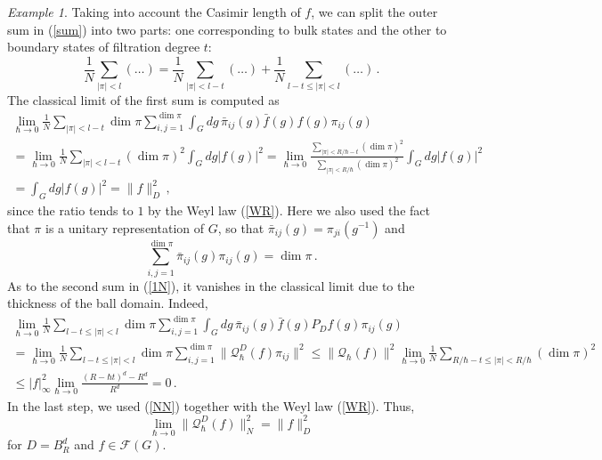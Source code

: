 \documentclass[12pt,a4paper]{article}
\numberwithin{equation}{section}
\theoremstyle{theorem}
\theoremstyle{remark}
\newtheorem{example}[equation]{Example}
\newcommand{\qq}{\mathcal{Q}_{\hbar}}
\newcommand{\ff}{\mathcal{F}}
\begin{document}
\begin{example}
Taking into account the Casimir length of $f$, we can split the outer sum in (\ref{sum}) into two parts: one corresponding to bulk states and the other to boundary states of filtration degree $t$:
\begin{equation}\label{1N}
\frac1N\sum_{|\pi|<l}(\ldots)=\frac1N\sum_{|\pi|<l-t}(\ldots)+\frac{1}{N}\sum_{ l-t\leq |\pi|<l}(\ldots)\,.
\end{equation}
The classical limit of the first sum is computed as
\begin{equation}
\begin{array}{c}
 \displaystyle  \lim_{\hbar\to 0} \frac1N\sum_{|\pi|<l-t}\dim \pi\sum_{i,j=1}^{\dim \pi}\int_Gdg\,\bar \pi_{ij}(g)\bar f(g)f(g)\pi_{ij}(g)\\[5mm]
 \displaystyle  =\lim_{\hbar\to 0} \frac1N\sum_{|\pi|<l-t}(\dim \pi)^2\int_Gdg|f(g)|^2=\lim_{\hbar\to 0} \frac{\sum_{|\pi|<R/\hbar-t}(\dim \pi)^2}{\sum_{|\pi|<R/\hbar}(\dim \pi)^2 
 }\int_Gdg|f(g)|^2\\[5mm]\displaystyle =\int_Gdg|f(g)|^2= \|f\|^2_D\,,
 \end{array}
\end{equation}
since the ratio tends to $1$ by the Weyl law (\ref{WR}).
Here we also used the fact that $\pi$ is  a unitary representation of $G$, so that $\bar \pi_{ij}(g)=\pi_{ji}(g^{-1})$ and
\begin{equation}
    \sum_{i,j=1}^{\dim \pi} \bar\pi_{ij}(g)\pi_{ij}(g)=\dim \pi\,.
\end{equation}
As to the second sum in (\ref{1N}), it vanishes in the classical limit due to the thickness of the ball domain. Indeed,
\begin{equation}
\begin{array}{c}
    \displaystyle  \lim_{\hbar\rightarrow0}\frac1N\sum_{l-t\leq|\pi|<l}\dim \pi\sum_{i,j=1}^{\dim \pi}\int_Gdg\,\bar \pi_{ij}(g)\bar f(g)P_D f(g)\pi_{ij}(g)\\[5mm]
  \displaystyle  =  \lim_{\hbar\to 0}\frac1N\sum_{l-t\leq|\pi|<l}\dim \pi\sum_{i,j=1}^{\dim \pi}\|\qq^D(f)\pi_{ij}\|^2\leq\|\qq(f)\|^2 \lim_{\hbar\rightarrow 0}\frac1N   \sum_{R/\hbar-t\leq|\pi|<R/\hbar}(\dim \pi)^2 \\[5mm]
 \displaystyle  \leq|f|_\infty^2\lim_{\hbar\to 0}\frac{(R-\hbar t)^d-R^d}{R^d}=0\,.
  \end{array}
      \end{equation}
In the last step, we used (\ref{NN}) together with the Weyl law (\ref{WR}). Thus, 
\begin{equation}\label{=}
    \lim_{\hbar\to 0}\|\qq^D(f)\|^2_N=\|f\|^2_D
\end{equation}
for $D=B_R^d$ and $f\in \ff(G)$. 


\end{example}
\end{document}
